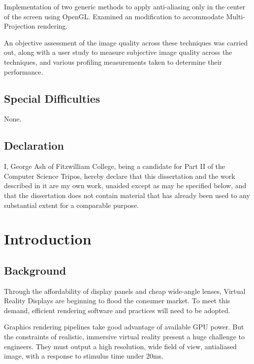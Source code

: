 \documentclass[12pt,a4paper,twoside,openright]{report}
\begin{document}
Implementation of two generic methods to apply anti-aliasing only in the center of the screen using OpenGL. Examined an modification to accommodate Multi-Projection rendering.

An objective assessment of the image quality across these techniques was carried out, along with a user study to measure subjective image quality across the techniques, and various profiling measurements taken to determine their performance.   

\section*{Special Difficulties}

None.
 
\newpage
\section*{Declaration}

I, George Ash of Fitzwilliam College, being a candidate for Part II of the Computer
Science Tripos, hereby declare
that this dissertation and the work described in it are my own work,
unaided except as may be specified below, and that the dissertation
does not contain material that has already been used to any substantial
extent for a comparable purpose.

\bigskip
{}

\medskip
{}

\tableofcontents

\listoffigures


\pagestyle{headings}

\chapter{Introduction}

\section{Background}

Through the affordability of display panels and cheap wide-angle lenses, Virtual Reality Displays are beginning to flood the consumer market. To meet this demand, efficient rendering software and practices will need to be adopted.

Graphics rendering pipelines take good advantage of available GPU power. But the constraints of realistic, immersive virtual reality present a huge challenge to engineers. They must output a high resolution, wide field of view, antialiased image, with a response to stimulus time under 20ms.
\end{document}
